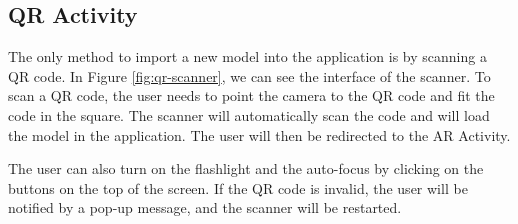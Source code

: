 \subsection{QR Activity}
The only method to import a new model into the application is by scanning a \ac{QR} code. In  Figure \ref{fig:qr-scanner}, we can see the interface of the scanner. To scan a \ac{QR} code, the user needs to point the camera to the \ac{QR} code and fit the code in the square. The scanner will automatically scan the code and will load the model in the application. The user will then be redirected to the \acf{AR} Activity.

The user can also turn on the flashlight and the auto-focus by clicking on the buttons on the top of the screen. If the QR code is invalid, the user will be notified by a pop-up message, and the scanner will be restarted.

